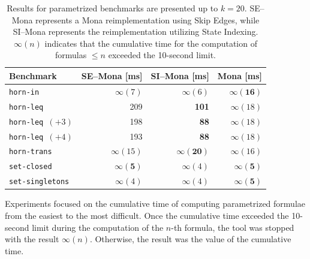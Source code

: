 \documentclass[pdflatex,sn-mathphys-num]{sn-jnl}%
\theoremstyle{thmstyleone}%
\theoremstyle{thmstyletwo}%
\theoremstyle{thmstylethree}%
\begin{document}
        \begin{table}[!h]
            \centering
            \captionsetup{width=\textwidth, justification=justified}
            \small
            \begin{tabular}{|l||r|r|r|}
                \hline
                Benchmark        	& SE--Mona [ms] & SI--Mona [ms] & Mona [ms]\\[0.5ex]
                \hline\hline
                \texttt{horn-in}   & $\infty(7)$  & $\infty(6)$ & \cellcolor{gray!25}$\mathbf{\infty(16)}$ \\[0.5ex]
                \texttt{horn-leq}   & 209  & \cellcolor{gray!25}\textbf{101} & $\infty(18)$ \\[0.5ex]
                \texttt{horn-leq $(+3)$}   & 198  & \cellcolor{gray!25}\textbf{88} & $\infty(18)$ \\[0.5ex]
                \texttt{horn-leq $(+4)$}   & 193  & \cellcolor{gray!25}\textbf{88} & $\infty(18)$ \\[0.5ex]
                \texttt{horn-trans}   & $\infty(15)$  & \cellcolor{gray!25}$\mathbf{\infty(20)}$ & $\infty(16)$ \\[0.5ex]
                \texttt{set-closed}   & \cellcolor{gray!25}$\mathbf{\infty(5)}$  & $\infty(4)$ & \cellcolor{gray!25}$\mathbf{\infty(5)}$ \\[0.5ex]
                \texttt{set-singletons}   & $\infty(4)$  & $\infty(4)$ & \cellcolor{gray!25}$\mathbf{\infty(5)}$ \\[0.5ex]

                \hline
            \end{tabular}
            \normalsize
            \vspace*{0.5em}
            \caption{Results for parametrized benchmarks are presented up to $k = 20$. SE--Mona represents a Mona reimplementation using Skip Edges, while SI--Mona represents the reimplementation utilizing State Indexing. $\infty(n)$ indicates that the cumulative time for the computation of formulas $\leq n$ exceeded the 10-second limit.}
            \label{table}
        \end{table}

        Experiments focused on the cumulative time of computing parametrized formulae from the easiest to the most difficult. Once the cumulative time exceeded the 10-second limit during the computation of the $n$-th formula, the tool was stopped with the result $\infty(n)$. Otherwise, the result was the value of the cumulative time.
\end{document}
